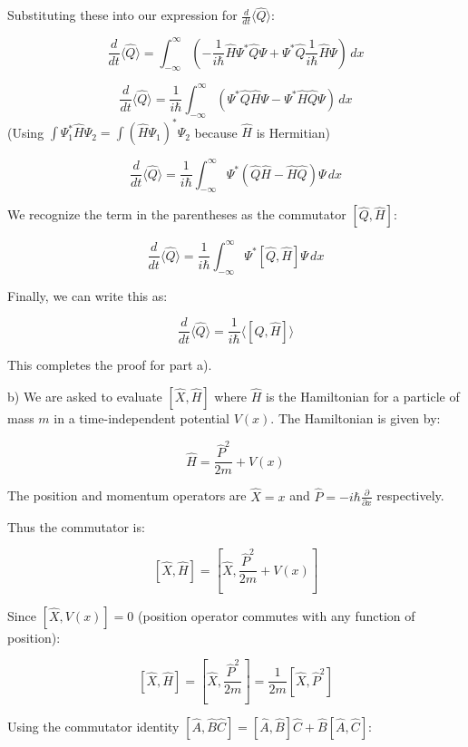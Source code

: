 \documentclass{article}
\begin{document}
\noindent Substituting these into our expression for $\frac{d}{dt} \langle \hat{Q} \rangle$:

\[
\frac{d}{dt} \langle \hat{Q} \rangle = \int_{-\infty}^{\infty} \left( -\frac{1}{i\hbar} \hat{H} \Psi^* \hat{Q} \Psi + \Psi^* \hat{Q} \frac{1}{i\hbar} \hat{H} \Psi \right) \, dx
\]

\[
\frac{d}{dt} \langle \hat{Q} \rangle = \frac{1}{i\hbar} \int_{-\infty}^{\infty} \left( \Psi^* \hat{Q} \hat{H} \Psi -  \Psi^* \hat{H} \hat{Q} \Psi \right) \, dx
\]
\noindent (Using $\int \Psi_1^* \hat{H} \Psi_2 = \int (\hat{H} \Psi_1)^* \Psi_2$ because $\hat{H}$ is Hermitian)

\[
\frac{d}{dt} \langle \hat{Q} \rangle = \frac{1}{i\hbar} \int_{-\infty}^{\infty} \Psi^* (\hat{Q} \hat{H} - \hat{H} \hat{Q}) \Psi \, dx
\]

\noindent We recognize the term in the parentheses as the commutator $[\hat{Q}, \hat{H}]$:

\[
\frac{d}{dt} \langle \hat{Q} \rangle = \frac{1}{i\hbar} \int_{-\infty}^{\infty} \Psi^* [\hat{Q}, \hat{H}] \Psi \, dx
\]

\noindent Finally, we can write this as:

\[
\frac{d}{dt} \langle \hat{Q} \rangle = \frac{1}{i\hbar} \langle [\hat{Q}, \hat{H}] \rangle
\]

\noindent This completes the proof for part a).

\noindent b) We are asked to evaluate $[\hat{X}, \hat{H}]$ where $\hat{H}$ is the Hamiltonian for a particle of mass $m$ in a time-independent potential $V(x)$. The Hamiltonian is given by:

\[
\hat{H} = \frac{\hat{P}^2}{2m} + V(x)
\]

\noindent The position and momentum operators are $\hat{X} = x$ and $\hat{P} = -i\hbar \frac{\partial}{\partial x}$ respectively.

\noindent Thus the commutator is:

\[
[\hat{X}, \hat{H}] = \left[ \hat{X}, \frac{\hat{P}^2}{2m} + V(x) \right]
\]

\noindent Since $[\hat{X}, V(x)] = 0$ (position operator commutes with any function of position):

\[
[\hat{X}, \hat{H}] = \left[ \hat{X}, \frac{\hat{P}^2}{2m} \right] = \frac{1}{2m} [\hat{X}, \hat{P}^2]
\]

\noindent Using the commutator identity $[\hat{A}, \hat{B}\hat{C}] = [\hat{A}, \hat{B}] \hat{C} + \hat{B} [\hat{A}, \hat{C}]$:
\end{document}
